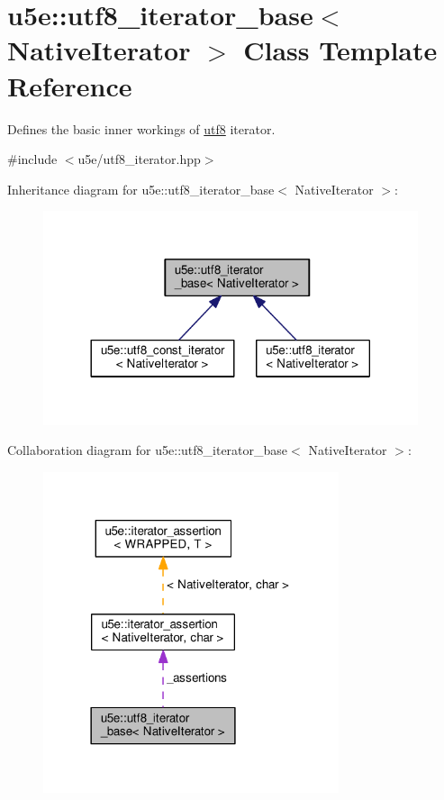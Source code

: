 \hypertarget{classu5e_1_1utf8__iterator__base}{}\section{u5e\+:\+:utf8\+\_\+iterator\+\_\+base$<$ Native\+Iterator $>$ Class Template Reference}
\label{classu5e_1_1utf8__iterator__base}


Defines the basic inner workings of \hyperlink{classu5e_1_1utf8}{utf8} iterator.  




{\ttfamily \#include $<$u5e/utf8\+\_\+iterator.\+hpp$>$}



Inheritance diagram for u5e\+:\+:utf8\+\_\+iterator\+\_\+base$<$ Native\+Iterator $>$\+:
\nopagebreak
\begin{figure}[H]
\begin{center}
\leavevmode
\includegraphics[width=312pt]{classu5e_1_1utf8__iterator__base__inherit__graph}
\end{center}
\end{figure}


Collaboration diagram for u5e\+:\+:utf8\+\_\+iterator\+\_\+base$<$ Native\+Iterator $>$\+:
\nopagebreak
\begin{figure}[H]
\begin{center}
\leavevmode
\includegraphics[width=246pt]{classu5e_1_1utf8__iterator__base__coll__graph}
\end{center}
\end{figure}
